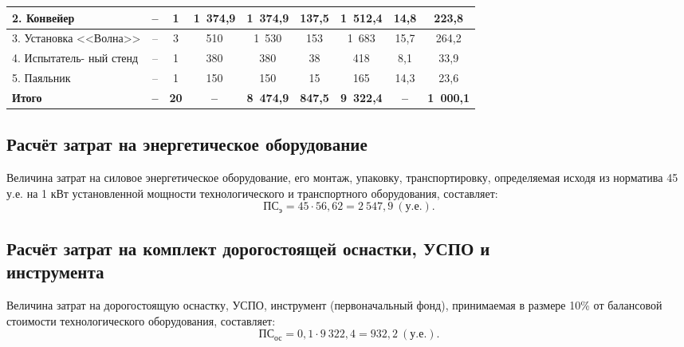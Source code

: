 \begin{table} [h!]
{\begin{tabular}{| m{2.8cm} | c | c | c | c | c | c | c | c |}
      2. Конвейер & --
      & 1
      & 1~374,9 & 1~374,9 & 137,5 & 1~512,4
      & 14,8 & 223,8 \\
      \hline

      3. Установка \newline <<Волна>> & --
      & 3
      & 510 & 1~530 & 153 & 1~683
      & 15,7 & 264,2 \\
      \hline

      4. Испытатель- \newline ный стенд & --
      & 1
      & 380 & 380 & 38 & 418
      & 8,1 & 33,9 \\
      \hline

      5. Паяльник & --
      & 1
      & 150 & 150 & 15 & 165
      & 14,3 & 23,6 \\
      \hline

      \textbf{Итого} & \textbf{--}
      & \textbf{20}
      & \textbf{--} & \textbf{8~474,9} & \textbf{847,5} & \textbf{9~322{,}4}
      & \textbf{--} & \textbf{1~000{,}1} \\
      \hline
    \end{tabular}
  }
\end{table}


\subsection{Расчёт затрат на энергетическое оборудование}

Величина затрат на силовое энергетическое оборудование, его монтаж,
упаковку, транспортировку, определяемая исходя из норматива 45 у.е.
на 1 кВт установленной мощности технологического и транспортного
оборудования, составляет:
\begin{equation*}
  \text{ПС}_{\text{э}} = 45 \cdot 56{,}62 = 2~547{,}9~(\text{у.е.}).
\end{equation*}


\subsection{Расчёт затрат на комплект дорогостоящей оснастки, УСПО и \\
инструмента}

Величина затрат на дорогостоящую оснастку, УСПО,
инструмент (первоначальный фонд), принимаемая в размере 10\% от
балансовой стоимости технологического оборудования, составляет:
\begin{equation*}
  \text{ПС}_{\text{ос}} = 0{,}1 \cdot 9~322{,}4 = 932{,}2 ~(\text{у.е.}).
\end{equation*}



